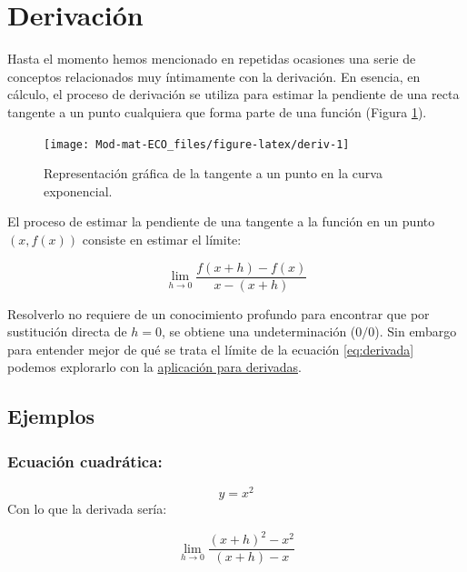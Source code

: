 \documentclass[
]{book}
\begin{document}
\hypertarget{derivaciuxf3n}{%
\section{Derivación}\label{derivaciuxf3n}}

Hasta el momento hemos mencionado en repetidas ocasiones una serie de conceptos relacionados muy íntimamente con la derivación. En esencia, en cálculo, el proceso de derivación se utiliza para estimar la pendiente de una recta tangente a un punto cualquiera que forma parte de una función (Figura \ref{fig:deriv}).

\begin{figure}

{\centering \texttt{[image: Mod-mat-ECO\_files/figure-latex/deriv-1]} 

}

\caption{Representación gráfica de la tangente a un punto en la curva exponencial.}\label{fig:deriv}
\end{figure}

El proceso de estimar la pendiente de una tangente a la función en un punto \((x, f(x))\) consiste en estimar el límite:

\begin{equation}
\lim \limits_{h \rightarrow 0} \frac{f(x + h) - f(x)}{x - (x + h)} \label{eq:derivada}
\end{equation}

Resolverlo no requiere de un conocimiento profundo para encontrar que por sustitución directa de \(h = 0\), se obtiene una undeterminación (\(0/0\)). Sin embargo para entender mejor de qué se trata el límite de la ecuación \eqref{eq:derivada} podemos explorarlo con la \href{https://www.geogebra.org/classic/rjttr8kq}{aplicación para derivadas}.

\hypertarget{ejemplos-2}{%
\subsection{Ejemplos}\label{ejemplos-2}}

\hypertarget{ecuaciuxf3n-cuadruxe1tica}{%
\subsubsection{Ecuación cuadrática:}\label{ecuaciuxf3n-cuadruxe1tica}}

\[ y = x^2\]
Con lo que la derivada sería:

\begin{equation}
\lim \limits_{h \rightarrow 0} \frac{(x + h)^2 - x^2}{(x+h) - x}
\end{equation}
\end{document}
